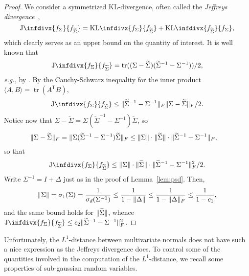 \documentclass[letterpaper]{amsart}
\makeatletter
\newcommand{\infdiv}{\mathrm{KL}\infdivx}
\newcommand{\sinfdiv}{\mathrm{J}\infdivx}
\DeclarePairedDelimiter{\norm}{\lVert}{\rVert}
\DeclareMathOperator{\tr}{tr}
\newcommand*{\eg}{\emph{e.g.,}\@\xspace}
\numberwithin{thm}{section}
\newcommand{\lemref}[1]{Lemma~\ref{lem:#1}}
\theoremstyle{definition}
\theoremstyle{plain}
\renewcommand{\tilde}[1]{\widetilde{#1}}
\newcommand{\transpose}{^{\mathsf{T}}}
\makeatother
\begin{document}
\begin{proof}
  We consider a symmetrized KL-divergence, often
  called the \emph{Jeffreys divergence}~\cite{kullback-book},
  \[
    \sinfdiv{f_{\Sigma}}{f_{\tilde{\Sigma}}} = \infdiv{f_{\Sigma}}{f_{\tilde{\Sigma}}} + \infdiv{f_{\tilde{\Sigma}}}{f_\Sigma} ,
  \]
  which clearly serves as an upper bound on the quantity of
  interest. It is well known that
  \[
    \sinfdiv{f_\Sigma}{f_{\tilde{\Sigma}}} =  \tr((\Sigma - \tilde{\Sigma}) (\tilde\Sigma^{-1} - {\Sigma}^{-1}))/2 ,
  \]
  \eg by \cite[Section 9.1]{kullback-book}. By the Cauchy-Schwarz
  inequality for the inner product
  $\langle A, B \rangle = \tr(A\transpose B)$,
  \[
    \sinfdiv{f_{\Sigma}}{f_{\tilde{\Sigma}}} \le \norm{\tilde{\Sigma}^{-1} - \Sigma^{-1}}_F \norm{\Sigma - \tilde{\Sigma}}_F/2 .
  \]
  Notice now that
  $\Sigma - \tilde{\Sigma} = \Sigma (\tilde{\Sigma}^{-1} -
  \Sigma^{-1}) \tilde{\Sigma}$, so
  \begin{align*}
    \norm{\Sigma - \tilde{\Sigma}}_F &= \norm{\Sigma (\tilde{\Sigma}^{-1} - \Sigma^{-1}) \tilde{\Sigma}}_F\le \norm{\Sigma} \cdot \norm{\tilde{\Sigma}} \cdot \norm{\tilde{\Sigma}^{-1} - \Sigma^{-1}}_F,
  \end{align*}
  so that
  \[
    \sinfdiv{f_\Sigma}{f_{\tilde{\Sigma}}} \le \norm{\Sigma}\cdot
     \norm{\tilde{\Sigma}} \cdot \norm{\tilde{\Sigma}^{-1} -
      \Sigma^{-1}}_F^2 /2 .
  \]
  Write $\Sigma^{-1} = I + \Delta$ just as in the proof of
  \lemref{psd}. Then,
  \[
    \norm{\Sigma} = \sigma_1(\Sigma) = \frac{1}{\sigma_d(\Sigma^{-1})} \le \frac{1}{1 - \|\Delta\|} \le \frac{1}{1 - \|\Delta\|_F} \le \frac{1}{1 - c_1} ,
  \]
  and the same bound holds for $\norm{\tilde{\Sigma}}$, whence $\sinfdiv{f_{\Sigma}}{f_{\tilde{\Sigma}}} \le c_2 \|\tilde{\Sigma}^{-1} - \Sigma^{-1}\|_F^2$.
\end{proof}

Unfortunately, the $L^1$-distance between multivariate normals does
not have such a nice expression as the Jeffreys divergence does. To
control some of the quantities involved in the computation of the
$L^1$-distance, we recall some properties of sub-gaussian random
variables.
\end{document}
